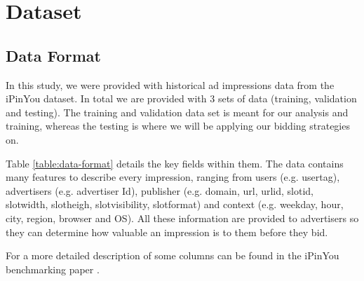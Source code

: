 \documentclass{sig-alternate-05-2015}
\begin{document}
\section{Dataset}
\subsection{Data Format}
In this study, we were provided with historical ad impressions data from the iPinYou dataset. In total we are provided with 3 sets of data (training, validation and testing). The training and validation data set is meant for our analysis and training, whereas the testing is where we will be applying our bidding strategies on. 

Table \ref{table:data-format} details the key fields within them. The data contains many features to describe every impression, ranging from users (e.g. usertag), advertisers (e.g. advertiser Id), publisher (e.g. domain, url, urlid, slotid, slotwidth, slotheigh, slotvisibility, slotformat) and context (e.g. weekday, hour, city, region, browser and OS). All these information are provided to advertisers so they can determine how valuable an impression is to them before they bid.

For a more detailed description of some columns can be found in the iPinYou benchmarking paper \cite{zhang_real-time_2014}.
\end{document}
